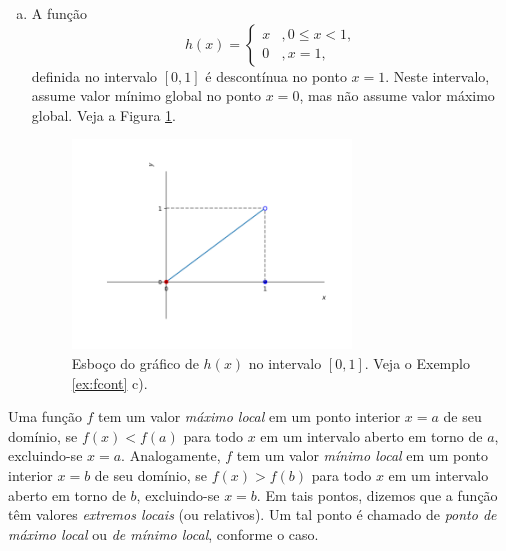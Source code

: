 \begin{ex}
\begin{enumerate}[a)]
\item A função
  \begin{equation}
    h(x) = \left\{
      \begin{array}{ll}
        x &, 0\leq x < 1,\\
        0 &, x=1,
      \end{array}
\right.
\end{equation}
definida no intervalo $[0, 1]$ é descontínua no ponto $x=1$. Neste intervalo, assume valor mínimo global no ponto $x=0$, mas não assume valor máximo global. Veja a Figura \ref{fig:ex_fcont_h}.
  \begin{figure}[H]
    \centering
    \includegraphics[width=0.7\textwidth]{./cap_apderiv/dados/fig_ex_fcont/fig_h}
    \caption{Esboço do gráfico de $h(x)$ no intervalo $[0,1]$. Veja o Exemplo \ref{ex:fcont} c).}
    \label{fig:ex_fcont_h}
  \end{figure}
  \end{enumerate}
\end{ex}

Uma função $f$ tem um valor \emph{máximo local} em um ponto interior $x=a$ de seu domínio, se $f(x) < f(a)$ para todo $x$ em um intervalo aberto em torno de $a$, excluindo-se $x=a$. Analogamente, $f$ tem um valor \emph{mínimo local} em um ponto interior $x=b$ de seu domínio, se $f(x) > f(b)$  para todo $x$ em um intervalo aberto em torno de $b$, excluindo-se $x=b$. Em tais pontos, dizemos que a função têm valores \emph{extremos locais} (ou relativos). Um tal ponto é chamado de \emph{ponto de máximo local} ou \emph{de mínimo local}, conforme o caso.

